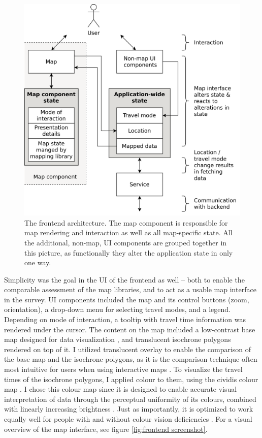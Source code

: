 \begin{figure}[H]  %
	\centering
	\includegraphics[width=\diagramwidth]{visual/figures/diagrams/frontend.png}
	\caption{
		The frontend architecture.
		The map component is responsible for map rendering and interaction
		as well as all map-specific state.
		All the additional, non-map, UI components are grouped together in this picture,
		as functionally they alter the application state in only one way.
	}
	\label{fig:frontend architecture}
\end{figure}

Simplicity was the goal in the UI of the frontend as well --
both to enable the comparable assessment of the map libraries,
and to act as a usable map interface in the survey.
UI components included the map and its control buttons (zoom, orientation),
a drop-down menu for selecting travel modes, and a legend.
Depending on mode of interaction,
a tooltip with travel time information was rendered under the cursor.
The content on the map included
a low-contrast base map designed for data visualization \parencite{cartopositron},
and translucent isochrone polygons rendered on top of it.
I utilized translucent overlay to
enable the comparison of the base map and the isochrone polygons,
as it is the comparison technique
often most intuitive for users when using interactive maps
\parencite{lob2015}.
To visualize the travel times of the isochrone polygons,
I applied colour to them, using the cividis colour map \parencite{nun2018}.
I chose this colour map since it is designed to enable accurate visual
interpretation of data through the perceptual uniformity of its colours,
combined with linearly increasing brightness \parencite{nun2018}.
Just as importantly, it is optimized to work equally well
for people with and without colour vision deficiencies \parencite{nun2018}.
For a visual overview of the map interface, see figure \ref{fig:frontend screenshot}.


